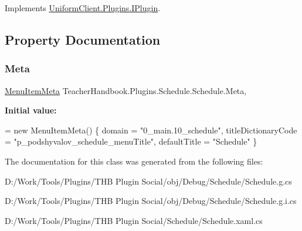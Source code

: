 Implements \mbox{\hyperlink{interface_uniform_client_1_1_plugins_1_1_i_plugin_a1ca2220c7ce4a23f8f41af10efccf328}{Uniform\+Client.\+Plugins.\+I\+Plugin}}.



\subsection{Property Documentation}
\mbox{\label{class_teacher_handbook_1_1_plugins_1_1_schedule_1_1_schedule_a42435b27bd43eb1afbf5a504bbae08b6}} 
\subsubsection{\texorpdfstring{Meta}{Meta}}
{\footnotesize\ttfamily \mbox{\hyperlink{class_uniform_client_1_1_plugins_1_1_menu_item_meta}{Menu\+Item\+Meta}} Teacher\+Handbook.\+Plugins.\+Schedule.\+Schedule.\+Meta\hspace{0.3cm}{\ttfamily [get]}, {\ttfamily [set]}}

{\bfseries Initial value\+:}
\begin{DoxyCode}
= \textcolor{keyword}{new} MenuItemMeta() \{
            domain = \textcolor{stringliteral}{"0\_main.10\_schedule"},
            titleDictionaryCode = \textcolor{stringliteral}{"p\_podshyvalov\_schedule\_menuTitle"},
            defaultTitle = \textcolor{stringliteral}{"Schedule"} \}
\end{DoxyCode}


The documentation for this class was generated from the following files\+:\begin{DoxyCompactItemize}
\item 
D\+:/\+Work/\+Tools/\+Plugins/\+T\+H\+B Plugin Social/obj/\+Debug/\+Schedule/Schedule.\+g.\+cs\item 
D\+:/\+Work/\+Tools/\+Plugins/\+T\+H\+B Plugin Social/obj/\+Debug/\+Schedule/Schedule.\+g.\+i.\+cs\item 
D\+:/\+Work/\+Tools/\+Plugins/\+T\+H\+B Plugin Social/\+Schedule/Schedule.\+xaml.\+cs\end{DoxyCompactItemize}
